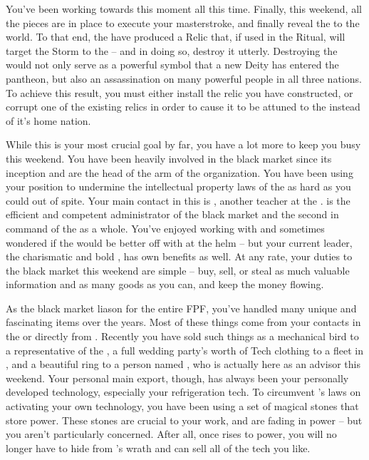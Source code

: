 \documentclass[char]{GL2020}
\begin{document}
You’ve been working towards this moment all this time. Finally, this weekend, all the pieces are in place to execute your masterstroke, and finally reveal the \pGoaties{} to the world. To that end, the \pGoaties{} have produced a Relic that, if used in the Ritual, will target the Storm to the \pSchool{} -- and in doing so, destroy it utterly. Destroying the \pSc{} would not only serve as a powerful symbol that a new Deity has entered the pantheon, but also an assassination on many powerful people in all three nations. To achieve this result, you must either install the relic you have constructed, or corrupt one of the existing relics in order to cause it to be attuned to the \pSc{} instead of it’s home nation.

While this is your most crucial goal by far, you have a lot more to keep you busy this weekend. You have been heavily involved in the black market since its inception and are the head of the \pTech{} arm of the organization. You have been using your position to undermine the intellectual property laws of the \pTech{} as hard as you could out of spite. Your main contact in this is \cChupSecond{}, another teacher at the \pSc{}. \cChupSecond{} is the efficient and competent administrator of the black market and the second in command of the \pGoaties{} as a whole. You’ve enjoyed working with \cChupSecond{} and sometimes wondered if the \pGoaties{} would be better off with \cChupSecond{} at the helm -- but your current leader, the charismatic and bold \cChupLeader{}, has \cChupLeader{\their} own benefits as well. At any rate, your duties to the black market this weekend are simple -- buy, sell, or steal as much valuable information and as many goods as you can, and keep the money flowing.

As the black market liason for the entire FPF, you've handled many unique and fascinating items over the years. Most of these things come from your contacts in the \pTech{} or directly from \cChupSecond{}. Recently you have sold such things as a mechanical bird to a representative of the \cQueen{}, a full wedding party’s worth of Tech clothing to a fleet in \pShip{}, and a beautiful ring to a person named \cHedonist{}, who is actually here as an advisor this weekend. Your personal main export, though, has always been your personally developed technology, especially your refrigeration tech. To circumvent \cTechGod{}’s laws on activating your own technology, you have been using a set of magical stones that store power. These stones are crucial to your work, and are fading in power -- but you aren’t particularly concerned. After all, once \cGenesis{} rises to power, you will no longer have to hide from \cTechGod{}’s wrath and can sell all of the tech you like.
\end{document}
